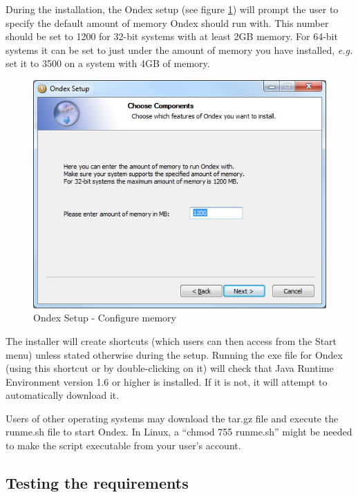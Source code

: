 During the installation, the Ondex setup (see figure \ref{fig:choose_memory}) 
will prompt the user to specify the default amount of memory Ondex should run with. 
This number should be set to 1200 for 32-bit systems with at least 2GB memory. 
For 64-bit systems it can be set to just under the amount of memory you have installed, 
\textit{e.g.} set it to 3500 on a system with 4GB of memory.

\begin{figure}[H]
\centering
\includegraphics[scale=0.75]{images/Oct12/choose_memory.png} 
\caption{Ondex Setup - Configure memory}
\label{fig:choose_memory}
\end{figure} 

The installer will create shortcuts (which users can then access from the Start menu) unless stated otherwise during the setup.
Running the exe file for Ondex (using this shortcut or by double-clicking on it) will check that Java Runtime Environment version 1.6 or higher is installed.
If it is not, it will attempt to automatically download it.

Users of other operating systems may download the tar.gz file and execute the runme.sh file to start Ondex.
In Linux, a ``chmod 755 runme.sh'' might be needed to make the script executable from your user's account.



\subsection{Testing the requirements}
\label{sec:testing_requirements}

